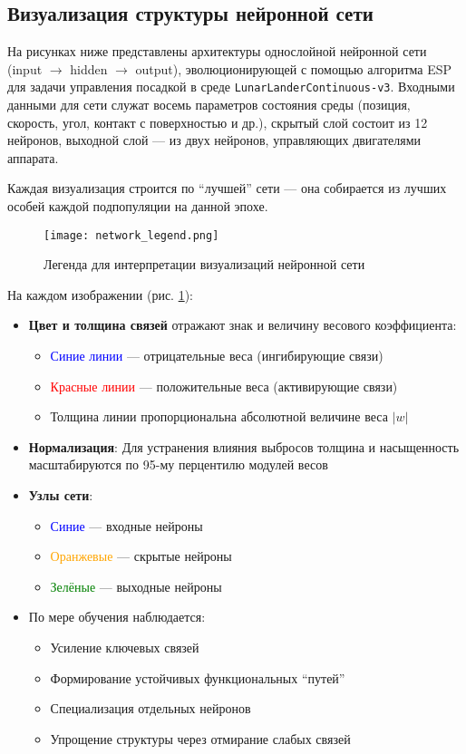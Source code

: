 \documentclass[a4paper,12pt]{article}
\begin{document}
\subsection{Визуализация структуры нейронной сети}

На рисунках ниже представлены архитектуры однослойной нейронной сети (input $\rightarrow$ hidden $\rightarrow$ output), эволюционирующей с помощью алгоритма ESP для задачи управления посадкой в среде \texttt{LunarLanderContinuous-v3}. Входными данными для сети служат восемь параметров состояния среды (позиция, скорость, угол, контакт с поверхностью и др.), скрытый слой состоит из 12 нейронов, выходной слой --- из двух нейронов, управляющих двигателями аппарата.

Каждая визуализация строится по ``лучшей'' сети --- она собирается из лучших особей каждой подпопуляции на данной эпохе.

\begin{figure}[h]
	\centering
	\texttt{[image: network\_legend.png]}
	\caption{Легенда для интерпретации визуализаций нейронной сети}
	\label{fig:network_legend}
\end{figure}

На каждом изображении (рис. \ref{fig:network_legend}):
\begin{itemize}
	\item \textbf{Цвет и толщина связей} отражают знак и величину весового коэффициента:
	\begin{itemize}
		\item \textcolor{blue}{Синие линии} --- отрицательные веса (ингибирующие связи)
		\item \textcolor{red}{Красные линии} --- положительные веса (активирующие связи)
		\item Толщина линии пропорциональна абсолютной величине веса $|w|$
	\end{itemize}
	\item \textbf{Нормализация}: Для устранения влияния выбросов толщина и насыщенность масштабируются по 95-му перцентилю модулей весов
	\item \textbf{Узлы сети}:
	\begin{itemize}
		\item \textcolor{blue}{Синие} --- входные нейроны
		\item \textcolor{orange}{Оранжевые} --- скрытые нейроны
		\item \textcolor{green}{Зелёные} --- выходные нейроны
	\end{itemize}
	\item По мере обучения наблюдается:
	\begin{itemize}
		\item Усиление ключевых связей
		\item Формирование устойчивых функциональных ``путей''
		\item Специализация отдельных нейронов
		\item Упрощение структуры через отмирание слабых связей
	\end{itemize}
\end{itemize}
\end{document}
